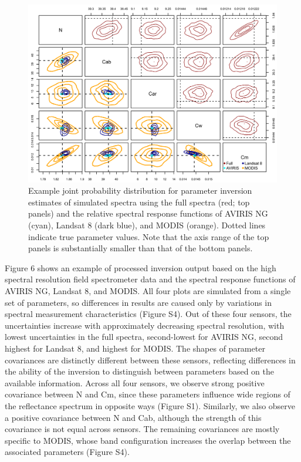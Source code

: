 \begin{figure}
  \centering
  \includegraphics[width=\textwidth]{2_rtm_inversion/figures/joint_posterior.png}
  \caption{%
    Example joint probability distribution for parameter inversion estimates of simulated spectra using the full spectra (red; top panels) and the relative spectral response functions of AVIRIS NG (cyan), Landsat 8 (dark blue), and MODIS (orange). 
    Dotted lines indicate true parameter values. Note that the axis range of the top panels is substantially smaller than that of the bottom panels.
  }\label{fig:pecanrtm-jointpost}
\end{figure}

Figure 6 shows an example of processed inversion output based on the high spectral resolution field spectrometer data and the spectral response functions of AVIRIS NG, Landsat 8, and MODIS\@.
All four plots are simulated from a single set of parameters, so differences in results are caused only by variations in spectral measurement characteristics (Figure S4). %
Out of these four sensors, the uncertainties increase with approximately decreasing spectral resolution, with lowest uncertainties in the full spectra, second-lowest for AVIRIS NG, second highest for Landsat 8, and highest for MODIS\@. %
The shapes of parameter covariances are distinctly different between these sensors, reflecting differences in the ability of the inversion to distinguish between parameters based on the available information.
Across all four sensors, we observe strong positive covariance between N and Cm, since these parameters influence wide regions of the reflectance spectrum in opposite ways (Figure S1). %
Similarly, we also observe a positive covariance between N and Cab, although the strength of this covariance is not equal across sensors.
The remaining covariances are mostly specific to MODIS, whose band configuration increases the overlap between the associated parameters (Figure S4). %

